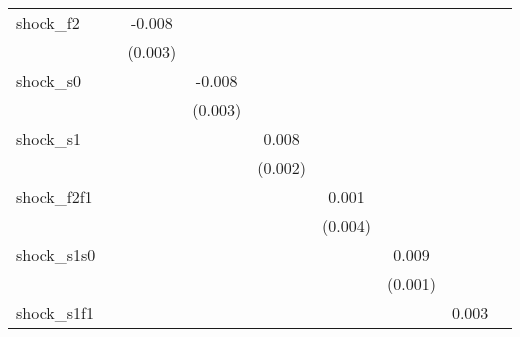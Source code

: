 {\begin{tabular}{l*{8}{c}}
\addlinespace
shock\_f2    &                     &      -0.008\sym{***}&                     &                     &                     &                     &                     &                     \\
            &                     &     (0.003)         &                     &                     &                     &                     &                     &                     \\
\addlinespace
shock\_s0    &                     &                     &      -0.008\sym{***}&                     &                     &                     &                     &                     \\
            &                     &                     &     (0.003)         &                     &                     &                     &                     &                     \\
\addlinespace
shock\_s1    &                     &                     &                     &       0.008\sym{***}&                     &                     &                     &                     \\
            &                     &                     &                     &     (0.002)         &                     &                     &                     &                     \\
\addlinespace
shock\_f2f1  &                     &                     &                     &                     &       0.001         &                     &                     &                     \\
            &                     &                     &                     &                     &     (0.004)         &                     &                     &                     \\
\addlinespace
shock\_s1s0  &                     &                     &                     &                     &                     &       0.009\sym{***}&                     &                     \\
            &                     &                     &                     &                     &                     &     (0.001)         &                     &                     \\
\addlinespace
shock\_s1f1  &                     &                     &                     &                     &                     &                     &       0.003         &                     \\

\end{tabular}}
